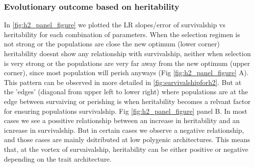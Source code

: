 \documentclass{article}
\begin{document}
\subsubsection{Evolutionary outcome based on heritability}
In \ref{fig:h2_panel_figure} we plotted the LR slopes/error of survivalship vs heritability for each combination of parameters. When the selection regimen is not  strong or the populations are close the new optimum (lower corner) heritability doesnt show any relationship with survivalship, neither when selection is very strong or the populations are very far away from the new optimum (upper corner), since most population will perish anyways (Fig \ref{fig:h2_panel_figure} A). This pattern can be observed in more detailed in \ref{fig:survivalshipforh2}. But at the 'edges' (diagonal from upper left to lower right) where populations are at the edge between survaiving or perishing is when heritability becomes a relvant factor for ensuring populations survivalship. Fig \ref{fig:h2_panel_figure} panel B. In most cases we see a possitive relationship between an increase in heritability and an icnrease in survivalship. But in certain cases we observe a negative relationship, and those cases are mainly dsitributed at low polygenic architectures. This means that, at the vortex of survaivalship, heritability can be either positive or negative depending on the trait architecture. 
\\
\end{document}
